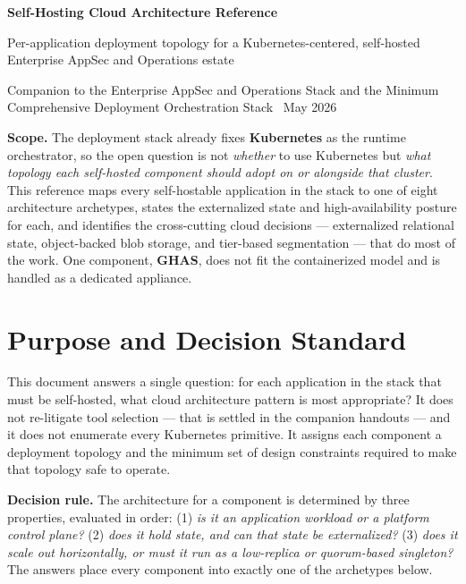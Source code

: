 \documentclass[10pt,letterpaper]{article}
\newcommand{\tool}[1]{\textbf{#1}}
\begin{document}
{\sffamily\bfseries\color{Navy}\Huge Self-Hosting Cloud Architecture Reference}\par
\vspace{3pt}
{\sffamily\large\color{GrayText} Per-application deployment topology for a Kubernetes-centered, self-hosted Enterprise AppSec and Operations estate}\par
\vspace{4pt}
{\sffamily\small\color{GrayText} Companion to the Enterprise AppSec and Operations Stack and the Minimum Comprehensive Deployment Orchestration Stack \textbullet\ May 2026}\par
\vspace{10pt}

\begin{summarybox}
\textbf{Scope.} The deployment stack already fixes \tool{Kubernetes} as the runtime orchestrator, so the open question is not \emph{whether} to use Kubernetes but \emph{what topology each self-hosted component should adopt on or alongside that cluster}. This reference maps every self-hostable application in the stack to one of eight architecture archetypes, states the externalized state and high-availability posture for each, and identifies the cross-cutting cloud decisions --- externalized relational state, object-backed blob storage, and tier-based segmentation --- that do most of the work. One component, \tool{GHAS}, does not fit the containerized model and is handled as a dedicated appliance.
\end{summarybox}

\section{Purpose and Decision Standard}

This document answers a single question: for each application in the stack that must be self-hosted, what cloud architecture pattern is most appropriate? It does not re-litigate tool selection --- that is settled in the companion handouts --- and it does not enumerate every Kubernetes primitive. It assigns each component a deployment topology and the minimum set of design constraints required to make that topology safe to operate.

\begin{decisionbox}
\textbf{Decision rule.} The architecture for a component is determined by three properties, evaluated in order: (1) \emph{is it an application workload or a platform control plane?} (2) \emph{does it hold state, and can that state be externalized?} (3) \emph{does it scale out horizontally, or must it run as a low-replica or quorum-based singleton?} The answers place every component into exactly one of the archetypes below.
\end{decisionbox}
\end{document}
